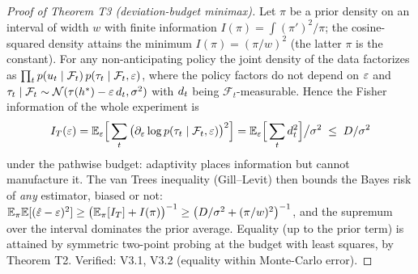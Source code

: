 \documentclass[11pt]{article}
\begin{document}
\begin{proof}[Proof of Theorem T3 (deviation-budget minimax)]
Let $\pi$ be a prior density on an interval of width $w$ with finite
information $I(\pi) = \int (\pi')^2/\pi$; the cosine-squared density
attains the minimum $I(\pi) = (\pi/w)^2$ (the latter $\pi$ is the
constant). For any non-anticipating policy the joint density of the data
factorizes as
$\prod_t p(u_t \mid \mathcal{F}_t)\, p(\tau_t \mid \mathcal{F}_t, \varepsilon)$,
where the policy factors do not depend on $\varepsilon$ and
$\tau_t \mid \mathcal{F}_t \sim \mathcal{N}(\tau(h^{*}) - \varepsilon\,d_t,
\sigma^2)$ with $d_t$ being $\mathcal{F}_t$-measurable. Hence the Fisher
information of the whole experiment is
\[
I_T(\varepsilon) = \mathbb{E}_\varepsilon\Big[\sum_t \big(\partial_\varepsilon \log
p(\tau_t \mid \mathcal{F}_t, \varepsilon)\big)^2\Big]
 = \mathbb{E}_\varepsilon\Big[\sum_t d_t^2\Big]\big/\sigma^2 \;\le\; D/\sigma^2
\]
under the pathwise budget: adaptivity places information but cannot
manufacture it. The van Trees inequality (Gill--Levit) then bounds the
Bayes risk of \emph{any} estimator, biased or not:
$\mathbb{E}_\pi \mathbb{E}[(\hat{\varepsilon} - \varepsilon)^2] \ge \big(\mathbb{E}_\pi[I_T] + I(\pi)\big)^{-1}
\ge \big(D/\sigma^2 + (\pi/w)^2\big)^{-1}$, and the supremum over the
interval dominates the prior average. Equality (up to the prior term) is
attained by symmetric two-point probing at the budget with least squares,
by Theorem T2. Verified: V3.1, V3.2 (equality within Monte-Carlo error).
\end{proof}
\end{document}
